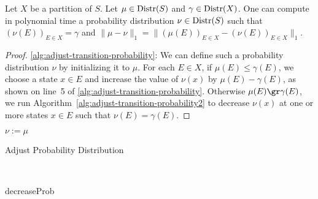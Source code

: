  
\begin{lemma}\label{lemma:adjust-probability-distribution-exists}
	Let $X$ be a partition of $S$. Let $\mu \in\mathrm{Distr}(S)$ and $\gamma \in \mathrm{Distr}(X)$. One can compute in polynomial time a probability distribution $\nu \in \mathrm{Distr}(S)$ such that $(\nu(E))_{E \in X} = \gamma$ and $\|\mu - \nu\|_1 = \|(\mu(E))_{E \in X} - (\nu(E))_{E \in X}\|_1$.
\end{lemma}
\begin{proof}
	\cref{alg:adjust-transition-probability}: We can define such a probability distribution $\nu$ by initializing it to $\mu$. For each $E \in X$, if $\mu(E) \le \gamma(E)$, we choose a state $x \in E$ and increase the value of $\nu(x)$ by $\mu(E) - \gamma(E)$, as shown on line~5 of \cref{alg:adjust-transition-probability}. Otherwise $\mu(E) \gr \gamma(E)$, we run Algorithm~\ref{alg:adjust-transition-probability2} to decrease $\nu(x)$ at one or more states $x \in E$ such that $\nu(E) = \gamma(E)$.
\end{proof}
\noindent
\begin{minipage}[h]{0.53\textwidth}
	\vspace{0pt}  
	\setlength{\algomargin}{0.001in}
	\begin{algorithm}[H]
		\DontPrintSemicolon
		$\nu := \mu$ \;
		\caption{Adjust Probability Distribution}
		\label{alg:adjust-transition-probability}
	\end{algorithm}
\end{minipage}
~
\begin{minipage}[h]{0.45\textwidth}
	\setlength{\algomargin}{0.01in}
	\begin{algorithm}[H] 
		\LinesNotNumbered
		\DontPrintSemicolon
		\caption{decreaseProb}
		\label{alg:adjust-transition-probability2}
	\end{algorithm}
\end{minipage}

